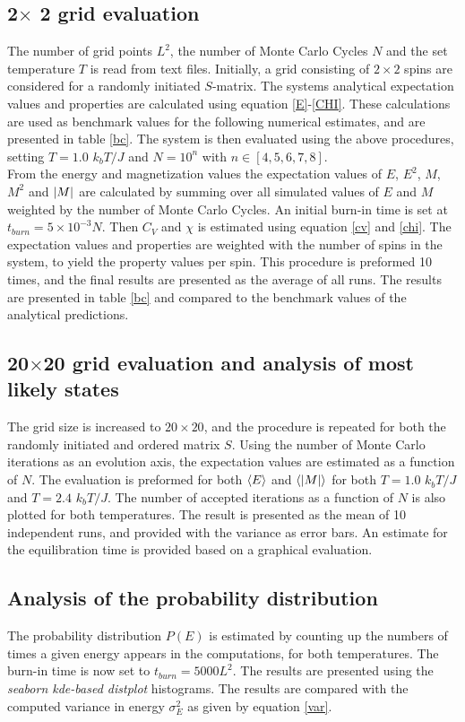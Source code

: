\documentclass[%
reprint,nofootinbib,
amsmath,amssymb,
aps,
]{revtex4-1}
\begin{document}
\subsection*{2$\times$ 2 grid evaluation} \noindent 
The number of grid points $L^2$, the number of Monte Carlo Cycles $N$ and the set temperature $T$ is read from text files. Initially, a grid consisting of $2\times 2$ spins are considered for a randomly initiated $S$-matrix. The systems analytical expectation values and properties are calculated using equation \ref{E}-\ref{CHI}. These calculations are used as benchmark values for the following numerical estimates, and are presented in table \ref{bc}. The system is then evaluated using the above procedures, setting $T = 1.0$ $k_bT/J$  and $N = 10^n$ with $n \in [4,5,6,7,8]$. \\ \indent 
 From the energy and magnetization values the expectation values of $E$, $E^2$, $M$, $M^2$ and $\abs{M}$ are calculated by summing over all simulated values of $E$ and $M$ weighted by the number of Monte Carlo Cycles. An initial burn-in time is set at $t_{burn} = 5\times10^{-3}N$. Then $C_V$ and $\chi$ is estimated using equation  \ref{cv} and \ref{chi}. The expectation values and properties are weighted with the number of spins in the system, to yield the property values per spin. This procedure is preformed 10 times, and the final results are presented as the average of all runs. The results are presented in table \ref{bc} and compared to the benchmark values of the analytical predictions. 
\subsection*{20$\times$20 grid evaluation and analysis of most likely states} \noindent 
The grid size is increased to $20\times20$, and the procedure is repeated for both the randomly initiated and ordered matrix $S$. Using the number of Monte Carlo iterations as an evolution axis, the expectation values are estimated as a function of $N$. The evaluation is preformed for both $\expval{E}$ and $\expval{\abs{M}}$ for both  $T = 1.0$ $k_bT/J$ and $T = 2.4$ $k_bT/J$. The number of accepted iterations as a function of $N$ is also plotted for both temperatures. The result is presented as the mean of 10 independent runs, and provided with the variance as error bars. An estimate for the equilibration time is provided based on a graphical evaluation. 
\subsection*{Analysis of the probability distribution} \noindent
The probability distribution $P(E)$ is estimated by counting up the numbers of times a given energy appears in the computations, for both temperatures. The burn-in time is now set to $t_{burn} = 5000L^2$. The results are presented using the \textit{seaborn kde-based distplot} histograms. The results are compared with the computed variance in energy $\sigma_E^2$ as given by equation \ref{var}. 
\end{document}

